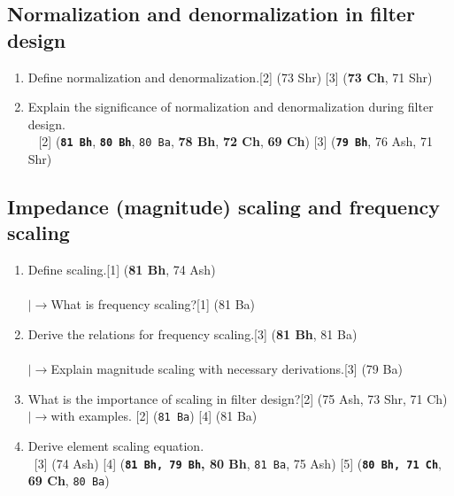 \documentclass[12pt]{article}
\newcommand{\lb}{\\$\left|\rightarrow\right.$}
\newcommand{\enter}{\\\textcolor{white}{1}}
\begin{document}
\subsection{Normalization and denormalization in filter design}
\begin{enumerate}
\item Define normalization and denormalization.\hfill[2] (73 Shr) [3] (\textbf{73 Ch}, 71 Shr)
\item Explain the significance of normalization and denormalization during filter design.\\
\textcolor{white}{1} \hfill [2] (\textbf{\texttt{81 Bh}}, \textbf{\texttt{80 Bh}}, \texttt{80 Ba}, \textbf{78 Bh}, \textbf{72 Ch}, \textbf{69 Ch}) [3] (\textbf{\texttt{79 Bh}}, 76 Ash, 71 Shr)
\end{enumerate}
\subsection{Impedance (magnitude) scaling and frequency scaling}
\begin{enumerate}
\item Define scaling.\hfill[1] (\textbf{81 Bh}, 74 Ash)\\
\lb What is frequency scaling?\hfill[1] (81 Ba)
\item Derive the relations for frequency scaling.\hfill[3] (\textbf{81 Bh}, 81 Ba) \\
\lb  Explain magnitude scaling with necessary derivations.\hfill[3] (79 Ba)
\item What is the importance of scaling in filter design?\hfill[2] (75 Ash, 73 Shr, 71 Ch)
\lb  with examples. \hfill[2] (\texttt{81 Ba}) [4] (81 Ba)
\item Derive element scaling equation.
\enter \hfill [3] (74 Ash) [4] (\textbf{\texttt{81 Bh, 79 Bh}, 80 Bh}, \texttt{81 Ba}, 75 Ash) [5] (\textbf{\texttt{80 Bh, 71 Ch}}, \textbf{69 Ch}, \texttt{80 Ba})
\end{enumerate}
\end{document}
